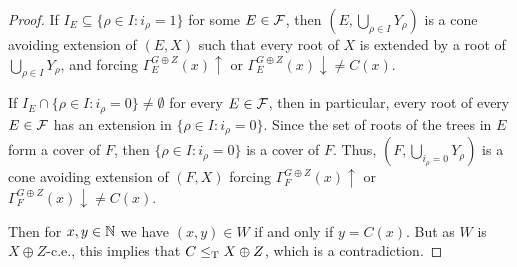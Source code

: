 \begin{proof}
	If $I_E \subseteq \{ \rho \in I: i_\rho = 1 \}$ for some $E \in \mathcal{F}$, then $(E, \bigcup_{\rho \in I} Y_\rho)$ is a cone avoiding extension of $(E, X)$ such that every root of $X$ is extended by a root of $\bigcup_{\rho \in I} Y_\rho$, and
	forcing $\Gamma^{G \oplus Z}_E(x) \uparrow$ or $\Gamma^{G \oplus Z}_E(x) \downarrow \neq C(x)$.

	If $I_E \cap \{ \rho \in I: i_\rho = 0 \} \neq \emptyset$ for every $E \in \mathcal{F}$, then in particular, every root of every $E \in \mathcal{F}$ has an extension in $\{ \rho \in I: i_\rho = 0 \}$. Since the set of roots of the trees in $E$ form a cover of $F$, then $\{ \rho \in I: i_\rho = 0 \}$ is a cover of $F$. Thus, $(F, \bigcup_{i_\rho = 0} Y_\rho)$ is a cone avoiding extension of $(F, X)$
	forcing $\Gamma^{G \oplus Z}_F(x) \uparrow$ or $\Gamma^{G \oplus Z}_F(x) \downarrow \neq C(x)$.

 Then for $x,y \in \mathbb{N}$ we have $(x,y) \in W$ if and only if $y = C(x)$. But as $W$ is $X \oplus Z$-c.e., this implies that $C \leq_{\text{\upshape T}} X \oplus Z$, which is a contradiction.
\end{proof}

%

